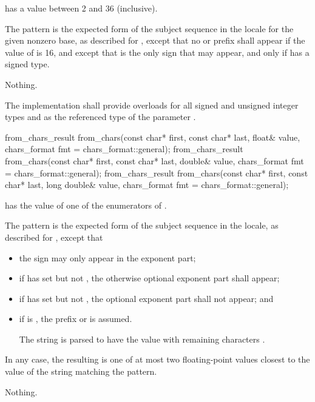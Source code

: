 \begin{itemdescr}
\pnum
\requires {} has a value between 2 and 36 (inclusive).

\pnum
\effects
The pattern is the expected form of the subject sequence
in the  locale
for the given nonzero base,
as described for ,
except that no  or  prefix shall appear
if the value of  is 16,
and except that 
is the only sign that may appear,
and only if  has a signed type.

\pnum
\throws
Nothing.

\pnum
\remarks
The implementation shall provide overloads
for all signed and unsigned integer types
and 
as the referenced type of the parameter .
\end{itemdescr}

%
\begin{itemdecl}
from_chars_result from_chars(const char* first, const char* last, float& value,
                             chars_format fmt = chars_format::general);
from_chars_result from_chars(const char* first, const char* last, double& value,
                             chars_format fmt = chars_format::general);
from_chars_result from_chars(const char* first, const char* last, long double& value,
                             chars_format fmt = chars_format::general);
\end{itemdecl}

\begin{itemdescr}
\pnum
\requires {} has the value of
one of the enumerators of .

\pnum
\effects
The pattern is the expected form of the subject sequence
in the  locale,
as described for ,
except that
\begin{itemize}
\item
the sign  may only appear in the exponent part;
\item
if  has  set
but not ,
the otherwise optional exponent part shall appear;
\item
if  has  set
but not ,
the optional exponent part shall not appear; and
\item
if  is ,
the prefix  or  is assumed.
\begin{example}
The string 
is parsed to have the value
with remaining characters .
\end{example}
\end{itemize}
In any case, the resulting  is one of
at most two floating-point values
closest to the value of the string matching the pattern.

\pnum
\throws
Nothing.
\end{itemdescr}

